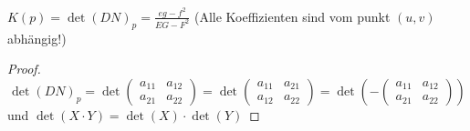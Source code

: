 \documentclass[../main.tex]{subfiles}
\begin{document}
\begin{corollary}
    $K(p) = \det(DN)_{p} = \frac{eg-f^{2}}{EG-F^{2}}$ (Alle Koeffizienten sind vom punkt $(u,v)$ abhängig!)
\end{corollary}
\begin{proof}
    $$\det(DN)_{p} = \det\begin{pmatrix}
        a_{11} & a_{12} \\ a_{21} & a_{22}
    \end{pmatrix} = \det\begin{pmatrix}
        a_{11} & a_{21} \\ a_{12} & a_{22}
    \end{pmatrix} = \det( - \begin{pmatrix}
        a_{11} & a_{12} \\ a_{21} & a_{22}
    \end{pmatrix})$$ und $\det(X\cdot Y) = \det(X)\cdot\det(Y)$
\end{proof}
\end{document}
